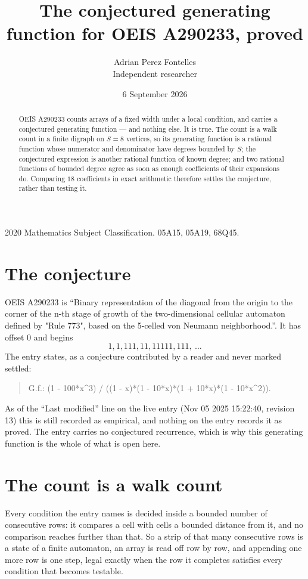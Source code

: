\documentclass[11pt,a4paper]{article}
\title{The conjectured generating function for OEIS A290233, proved}
\author{Adrian Perez Fontelles\\ \small Independent researcher}
\date{6 September 2026}
\theoremstyle{plain}
\theoremstyle{definition}
\begin{document}
\maketitle

\begin{abstract}
OEIS A290233 counts arrays of a fixed width under a local condition, and carries a conjectured
generating function --- and nothing else. It is true. The count is a walk count in a finite
digraph on $S=8$ vertices, so its generating function is a rational function whose numerator
and denominator have degrees bounded by $S$; the conjectured expression is another rational
function of known degree; and two rational functions of bounded degree agree as soon as enough
coefficients of their expansions do. Comparing $18$ coefficients in exact arithmetic
therefore settles the conjecture, rather than testing it.
\end{abstract}

\noindent\small 2020 Mathematics Subject Classification. 05A15, 05A19, 68Q45.\normalsize

\section{The conjecture}

OEIS A290233 is ``Binary representation of the diagonal from the origin to the corner of the n-th stage of growth of the two-dimensional cellular automaton defined by "Rule 773", based on the 5-celled von Neumann neighborhood.''. It has offset $0$ and begins
\[
1, 1, 111, 11, 11111, 111,\ \dots
\]
The entry states, as a conjecture contributed by a reader and never marked settled:
\begin{quote}
G.f.: (1 - 100*x\^{}3) / ((1 - x)*(1 - 10*x)*(1 + 10*x)*(1 - 10*x\^{}2)).
\end{quote}
As of the ``Last modified'' line on the live entry (Nov 05 2025 15:22:40, revision 13) this is still
recorded as empirical, and nothing on the entry records it as proved. The entry carries no
conjectured recurrence, which is why this generating function is the whole of what is open
here.

\section{The count is a walk count}

Every condition the entry names is decided inside a bounded number of consecutive rows: it
compares a cell with cells a bounded distance from it, and no comparison reaches further than
that. So a strip of that many consecutive rows is a state of a finite automaton, an array is
read off row by row, and appending one more row is one step, legal exactly when the row it
completes satisfies every condition that becomes testable.
\end{document}
